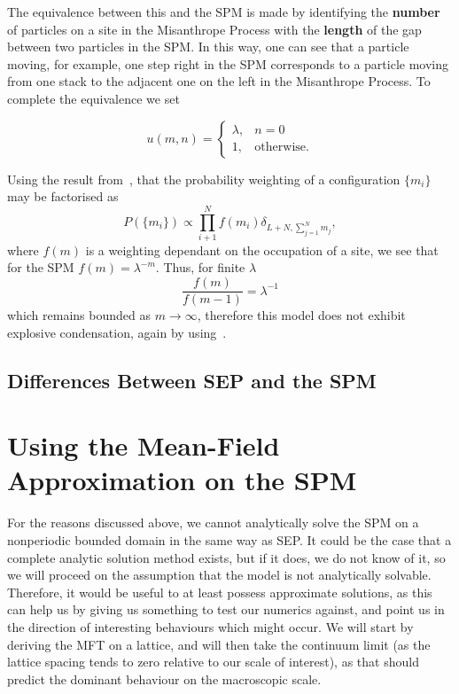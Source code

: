 The equivalence between this and the SPM is made by identifying the \textbf{number} of particles on a site in the Misanthrope Process with the \textbf{length} of the gap between two particles in the SPM. In this way, one can see that a particle
moving, for example, one step right in the SPM corresponds to a particle moving from one stack to the adjacent one on the left in the Misanthrope Process. To complete the equivalence we set


\[
  u(m, n) =
  \begin{cases}
                                   \lambda, & n=0 \\
                                   1, & \text{otherwise.} 
  \end{cases}
\]

Using the result from~\cite{evansWaclaw2014}, that the probability weighting of a configuration $\{m_i\}$ may be factorised as
\begin{equation}
 P(\{m_i\}) \propto \prod_{i+1}^N f(m_i) \delta_{L+N, \sum_{j=1}^N m_j},
\end{equation}
where $f(m)$ is a weighting dependant on the occupation of a site,  we see that for the SPM $f(m) = \lambda^{-m}$. Thus, for finite $\lambda$ 
\begin{equation}
 \frac{f(m)}{f(m-1)} = \lambda^{-1}
\end{equation}
which remains bounded as $m \rightarrow \infty$, therefore this model does not exhibit explosive condensation, again by using~\cite{evansWaclaw2014}.

\subsection{Differences Between SEP and the SPM}

\section{Using the Mean-Field Approximation on the SPM}

For the reasons discussed above, we cannot analytically solve the SPM on a nonperiodic bounded domain in the same way as SEP. It could be the case that a complete analytic solution method exists, but if it does, we do not know of it, so
we will proceed on the assumption that the model is not analytically solvable. Therefore, it would be useful to at least possess approximate solutions, as this can help us by giving us something to test
our numerics against, and point us in the direction of interesting behaviours which might occur. We will start by deriving the MFT on a lattice, and will then take the continuum limit (as the lattice spacing tends to zero
relative to our scale of interest), as that should predict the dominant behaviour on the macroscopic scale.


